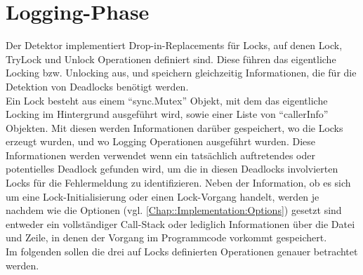 \section{Logging-Phase} \label{Chap::Implementation:Logging}
Der Detektor implementiert Drop-in-Replacements für Locks, auf denen Lock,
TryLock und Unlock Operationen definiert sind. 
Diese führen das eigentliche Locking bzw. Unlocking aus, und 
speichern gleichzeitig Informationen, die für die Detektion von Deadlocks 
benötigt werden.\\
Ein Lock besteht aus einem ``sync.Mutex'' Objekt, mit dem das eigentliche
Locking im Hintergrund ausgeführt wird, sowie einer Liste von ``callerInfo''
Objekten. Mit diesen werden Informationen darüber gespeichert, wo die 
Locks erzeugt wurden, und wo Logging Operationen ausgeführt wurden. Diese 
Informationen werden verwendet wenn ein tatsächlich auftretendes 
oder potentielles Deadlock gefunden wird, um die in diesen Deadlocks involvierten 
Locks für die Fehlermeldung zu identifizieren. Neben der Information, ob es sich 
um eine Lock-Initialisierung oder einen Lock-Vorgang handelt, werden je nachdem
wie die Optionen (vgl. \ref{Chap::Implementation:Options}) gesetzt sind entweder 
ein vollständiger Call-Stack oder lediglich Informationen über die Datei und 
Zeile, in denen der Vorgang im Programmcode vorkommt gespeichert.\\
Im folgenden sollen die drei auf Locks definierten Operationen genauer betrachtet
werden.
